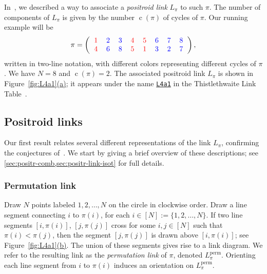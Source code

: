 \documentclass[11pt]{article}
\theoremstyle{definition}
\numberwithin{equation}{section}
\newcommand\perm{\operatorname{perm}}
\newcommand\Lperm{L^{\perm}}
\newcommand\fp{\pi}
\def\figref#1(#2){Figure~\hyperref[#1]{\ref*{#1}(#2)}}
\newcommand\conn{\operatorname{c}}
\newcommand\ncyc{\conn}
\newcommand\n{N}
\def\linkurl#1{\textup{\texttt{\href{http://katlas.org/wiki/#1}{#1}}}}
\begin{document}
In~\cite{GL_qtcat}, we described a way to associate a \emph{positroid link} $L_\fp$ to such $\fp$. The number of components of $L_\fp$ is given by the number $\ncyc(\fp)$ of cycles of $\fp$. Our running example will be
\begin{equation}\label{eq:intro:fp}
 \fp=\left(\!\!\text{
\begin{tabular}{cccccccc}
\textcolor{red}{$1$} & \textcolor{blue}{$2$} & \textcolor{blue}{$3$} & \textcolor{red}{$4$} & \textcolor{red}{$5$} & \textcolor{blue}{$6$} & \textcolor{blue}{$7$} & \textcolor{blue}{$8$}\\
\textcolor{red}{$4$} & \textcolor{blue}{$6$} & \textcolor{blue}{$8$} & \textcolor{red}{$5$} & \textcolor{red}{$1$} & \textcolor{blue}{$3$} & \textcolor{blue}{$2$} & \textcolor{blue}{$7$}
\end{tabular}
}\!\!\right),
\end{equation}
written in two-line notation, with different colors representing different cycles of $\fp$. We have $\n=8$ and $\ncyc(\fp)=2$. The associated positroid link $L_\fp$ is shown in \figref{fig:L4a1}(a); it appears under the name \linkurl{L4a1} in the Thistlethwaite Link Table~\cite{KAT}. 

\subsection{Positroid links} \label{sec:intro:positroid_links}

Our first result relates several different representations of the link $L_\fp$, confirming the conjectures of~\cite{GL_qtcat,GL_cat_combin}. We start by giving a brief overview of these descriptions; see \cref{sec:positr-comb,sec:positr-link-isot} for full details.

\subsubsection{Permutation link} \label{sec:intro:perm_links}
Draw $\n$ points labeled $1,2,\dots,\n$ on the circle in clockwise order. Draw a line segment connecting $i$ to $\fp(i)$, for each $i\in[\n]:=\{1,2,\dots,\n\}$. If two line segments $[i, \fp(i)]$, $[j,\fp(j)]$ cross for some $i,j\in[\n]$ such that $\fp(i)<\fp(j)$, then the segment $[j,\fp(j)]$ is drawn above $[i, \fp(i)]$; see \figref{fig:L4a1}(b). 
%
 The union of these segments gives rise to a link diagram. We refer to the resulting link as the \emph{permutation link} of $\fp$, denoted $\Lperm_\fp$. Orienting each line segment from $i$ to $\fp(i)$ induces an orientation on $\Lperm_\fp$.
\end{document}
